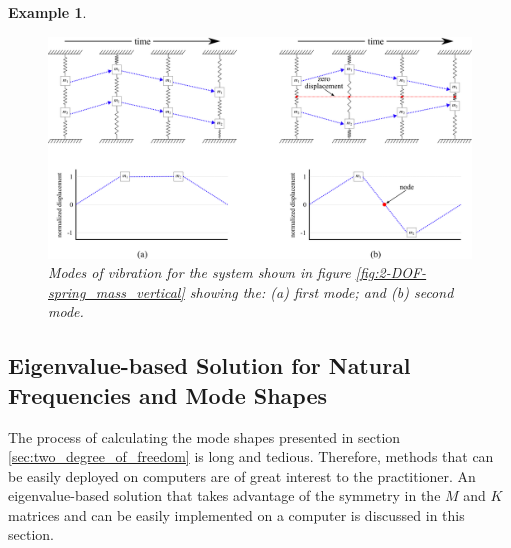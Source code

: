 \documentclass[12pt,letter]{article}
\newtheorem{ex}{Example}
\numberwithin{ex}{section} %
\newenvironment{example}{\begin{mdframed}[middlelinewidth=0.5mm]\begin{ex}\normalfont}{\end{ex}\end{mdframed}}
\numberwithin{re}{section} %
\begin{document}
\begin{example}
\begin{figure}[H]
	\centering
	\includegraphics[width=\linewidth]{../Figures/2-DOF_mode_shape.png}
	\caption{Modes of vibration for the system shown in figure \ref{fig:2-DOF-spring_mass_vertical} showing the: (a) first mode; and (b) second mode.}
	\label{fig:2-DOF_mode_shape}
\end{figure}
\end{example}

\subsection{Eigenvalue-based Solution for Natural Frequencies and Mode Shapes}

The process of calculating the mode shapes presented in section \ref{sec:two_degree_of_freedom} is long and tedious. Therefore, methods that can be easily deployed on computers are of great interest to the practitioner. An eigenvalue-based solution that takes advantage of the symmetry in the $M$ and $K$ matrices and can be easily implemented on a computer is discussed in this section. 
\end{document}
